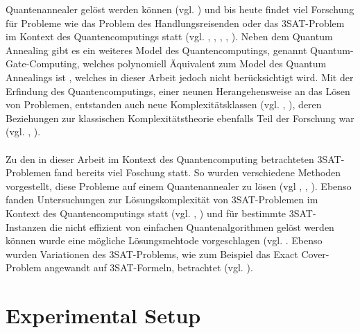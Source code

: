 \documentclass[runningheads]{llncs}
\begin{document}
Quantenannealer gelöst werden können (vgl. \cite{lucas2014ising}) und bis heute findet viel Forschung für Probleme wie das Problem des Handlungsreisenden oder das 3SAT-Problem im Kontext des Quantencomputings statt (vgl. \cite{heim2017designing}, \cite{warren2017small}, \cite{moylett2017quantum}, \cite{strand2017zzz}, \cite{benjamin2017measurement}). Neben dem Quantum Annealing gibt es ein weiteres Model des Quantencomputings, genannt Quantum-Gate-Computing, welches polynomiell Äquivalent zum Model des Quantum Annealings ist \cite{mcgeoch2014adiabatic}, welches in dieser Arbeit jedoch nicht berücksichtigt wird. Mit der Erfindung des Quantencomputings, einer neunen Herangehensweise an das Lösen von Problemen, entstanden auch neue Komplexitätsklassen (vgl. \cite{klauck2017complexity}, \cite{morimae2017merlinization}), deren Beziehungen zur klassischen Komplexitätstheorie ebenfalls Teil der Forschung war (vgl. \cite{bernstein1997quantum}, \cite{marriott2005quantum}).\\\\Zu den in dieser Arbeit im Kontext des Quantencomputing betrachteten 3SAT-Problemen fand bereits viel Foschung statt. So wurden verschiedene Methoden vorgestellt, diese Probleme auf einem Quantenannealer zu lösen (vgl \cite{choi2011different}, \cite{choi2010adiabatic}, \cite{farhi2000quantum}). Ebenso fanden Untersuchungen zur Lösungskomplexität von 3SAT-Problemen im Kontext des Quantencomputings statt (vgl. \cite{van2001powerful}, \cite{farhi2000numerical}) und für bestimmte 3SAT-Instanzen die nicht effizient von einfachen Quantenalgorithmen gelöst werden können wurde eine mögliche Lösungsmehtode vorgeschlagen (vgl. \cite{farhi2009quantum}. Ebenso wurden Variationen des 3SAT-Problems, wie zum Beispiel das  Exact Cover-Problem angewandt auf 3SAT-Formeln, betrachtet (vgl. \cite{farhi2001quantum}). 

\section{Experimental Setup}
\end{document}

